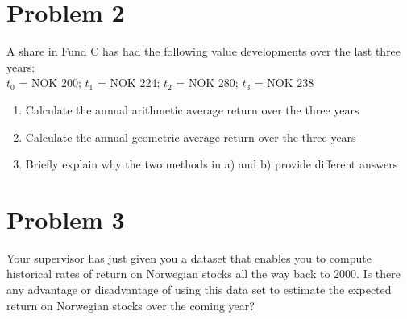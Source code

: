 \documentclass[12]{article}
\begin{document}
\section*{Problem 2}
A share in Fund C has had the following value developments over the last three years:\\
$t_0$ = NOK 200; $t_1$ = NOK 224; $t_2$ = NOK 280; $t_3$ = NOK 238
\begin{enumerate}
    \item[a)] Calculate the annual arithmetic average return over the three years
    \item[b)] Calculate the annual geometric average return over the three years
    \item[c)] Briefly explain why the two methods in a) and b) provide different answers
\end{enumerate}


\section*{Problem 3}
Your supervisor has just given you a dataset that enables you to compute historical rates of return on Norwegian stocks all the way back to 2000. Is there any advantage or disadvantage of using this data set to estimate the expected return on Norwegian stocks over the coming year?
\end{document}
